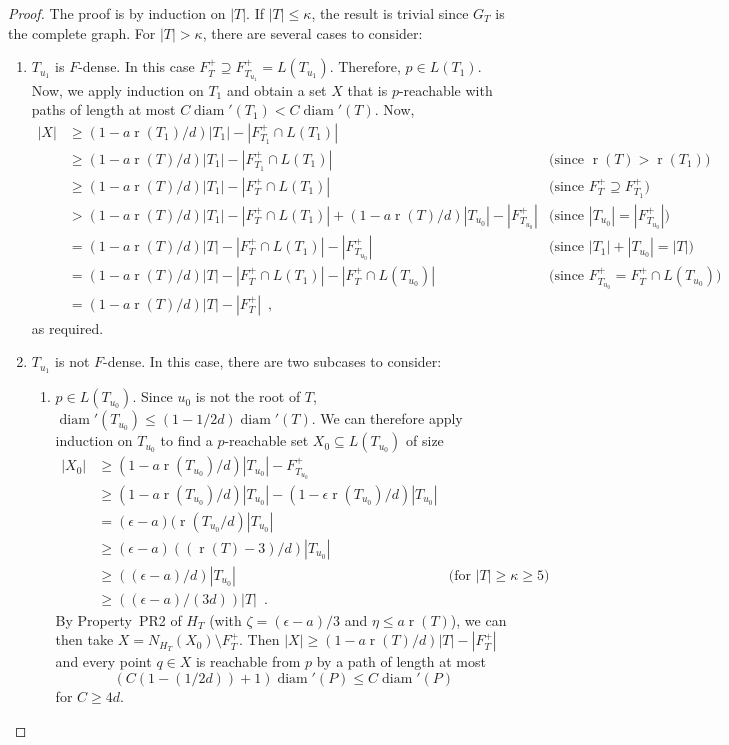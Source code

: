 \documentclass{patmorin}
\DeclareMathOperator{\rank}{r}
\DeclareMathOperator{\diam}{diam}
\begin{document}
\begin{proof}
  The proof is by induction on $|T|$.  If $|T|\le\kappa$, the result is trivial since $G_T$ is the complete graph.
  For $|T|>\kappa$, there are several cases to consider:
  \begin{enumerate}
	  \item $T_{u_1}$ is $F$-dense. In this case $F^+_T\supseteq
	  F^+_{T_{u_1}}= L(T_{u_1})$. Therefore, $p\in L(T_1)$.
          Now, we apply induction on $T_1$
       and obtain a set $X$ that is $p$-reachable with paths of length at
		  most $C\diam'(T_1)< C\diam'(T)$.  Now, 
	\begin{align*}
		|X| & \ge (1-a\rank(T_1)/d)|T_1|-|F^+_{T_1} \cap L(T_1)| \\
		& \ge (1-a\rank(T)/d)|T_1|-|F^+_{T_1} \cap L(T_1)| 
	 	& \text{(since $\rank(T)>\rank(T_1)$)} \\
		& \ge (1-a\rank(T)/d)|T_1|-|F^+_{T} \cap L(T_1)| 
		& \text{(since $F^+_T\supseteq F^+_{T_1}$)} \\
		& > (1-a\rank(T)/d)|T_1|-|F^+_{T} \cap L(T_1)| 
		  + (1-a\rank(T)/d)|T_{u_0}|-|F^+_{T_{u_0}}|
		& \text{(since $|T_{u_0}|=|F^+_{T_{u_0}}|$)} \\
		& = (1-a\rank(T)/d)|T|-|F^+_{T}\cap L(T_1)| - |F^+_{T_{u_0}}|
		& \text{(since $|T_1|+|T_{u_0}|=|T|$)} \\
		& = (1-a\rank(T)/d)|T|-|F^+_{T}\cap L(T_1)| - |F^+_T\cap L(T_{u_0})|
		& \text{(since $F^+_{T_{u_0}}=F^+_T\cap L(T_{u_0})$)} \\
		& = (1-a\rank(T)/d)|T|-|F^+_{T}| \enspace , 
	\end{align*}
	as required.
    \item $T_{u_1}$ is not $F$-dense. In this case, there are two subcases
    to consider:
    \begin{enumerate}
	    \item $p\in L(T_{u_0})$. 
		    Since $u_0$ is not the root of $T$, $\diam'(T_{u_0}) \le (1-1/2d)\diam'(T)$.  We can therefore apply induction on $T_{u_0}$ to find a $p$-reachable set $X_0\subseteq L(T_{u_0})$ of size 
\begin{align*}
	|X_0| & \ge (1-a\rank(T_{u_0})/d)|T_{u_0}|-F^+_{T_{u_0}} \\
	      & \ge (1-a\rank(T_{u_0})/d)|T_{u_0}|-(1-\epsilon\rank(T_{u_0})/d)|T_{u_0}| \\
	      & = (\epsilon-a)(\rank(T_{u_0}/d)|T_{u_0}| \\
	      & \ge (\epsilon-a)((\rank(T)-3)/d)|T_{u_0}| \\
	      & \ge ((\epsilon-a)/d)|T_{u_0}| 
		& \text{(for $|T|\ge \kappa \ge 5$)} \\
	      & \ge ((\epsilon-a)/(3d))|T| \enspace .
\end{align*}
	    By Property~PR2 of $H_T$ (with $\zeta = (\epsilon-a)/3$ and $\eta \le a\rank(T)$), we can then take $X=N_{H_T}(X_0)\setminus F^+_T$.  Then $|X| \ge (1-a\rank(T)/d)|T|-|F^+_T|$ and every point $q\in X$ is reachable from $p$ by a path of length at most
		    \[ (C(1-(1/2d))+1)\diam'(P) \le C\diam'(P) \]
	     for $C\ge 4d$.


\end{enumerate}
\end{enumerate}
\end{proof}
\end{document}
